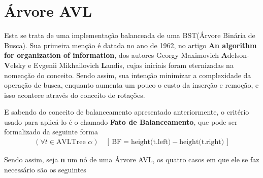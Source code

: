 \section{Árvore AVL}
\label{sec:avl}

Esta se trata de uma implementação balanceada de uma BST(Árvore Binária de Busca). Sua primeira menção é datada no ano de 1962, no artigo \textbf{An algorithm for organization of information}, dos autores Georgy Maximovich \textbf{A}delson-\textbf{V}elsky e Evgenii Mikhailovich \textbf{L}andis, cujas iniciais foram eternizadas na nomeação do conceito. Sendo assim, sua intenção minimizar a complexidade da operação de busca, enquanto aumenta um pouco o custo da inserção e remoção, e isso acontece através do conceito de rotações.

E sabendo do conceito de balanceamento apresentado anteriormente, o critério usado para aplicá-lo é o chamado \textbf{Fato de Balanceamento}, que pode ser formalizado da seguinte forma
\begin{align*}
   (\forall t \in \text{AVLTree } \alpha) \quad 
   \left[ \, \text{BF} = \text{height(t.left)} - \text{height(t.right)} \, \right]
\end{align*}

Sendo assim, seja \textbf{n} um nó de uma Árvore AVL, os quatro casos em que ele se faz necessário são os seguintes

